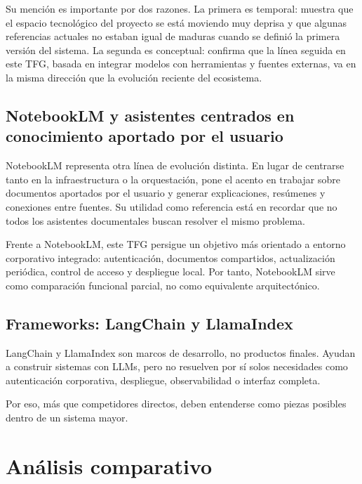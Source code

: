 Su mención es importante por dos razones. La primera es temporal: muestra que el espacio tecnológico del proyecto se está moviendo muy deprisa y que algunas referencias actuales no estaban igual de maduras cuando se definió la primera versión del sistema. La segunda es conceptual: confirma que la línea seguida en este TFG, basada en integrar modelos con herramientas y fuentes externas, va en la misma dirección que la evolución reciente del ecosistema.

\subsection{NotebookLM y asistentes centrados en conocimiento aportado por el usuario}

NotebookLM \cite{notebooklm2025docs} representa otra línea de evolución distinta. En lugar de centrarse tanto en la infraestructura o la orquestación, pone el acento en trabajar sobre documentos aportados por el usuario y generar explicaciones, resúmenes y conexiones entre fuentes. Su utilidad como referencia está en recordar que no todos los asistentes documentales buscan resolver el mismo problema.

Frente a NotebookLM, este TFG persigue un objetivo más orientado a entorno corporativo integrado: autenticación, documentos compartidos, actualización periódica, control de acceso y despliegue local. Por tanto, NotebookLM sirve como comparación funcional parcial, no como equivalente arquitectónico.

\subsection{Frameworks: LangChain y LlamaIndex}

LangChain \cite{langchainRetrievalDocs} y LlamaIndex \cite{llamaindexRagDocs} son marcos de desarrollo, no productos finales. Ayudan a construir sistemas con LLMs, pero no resuelven por sí solos necesidades como autenticación corporativa, despliegue, observabilidad o interfaz completa.

Por eso, más que competidores directos, deben entenderse como piezas posibles dentro de un sistema mayor.

\section{Análisis comparativo}

